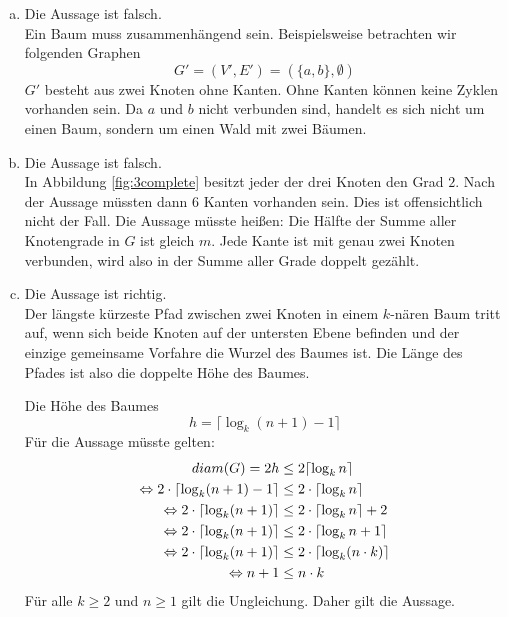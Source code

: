 \documentclass[a4paper]{scrartcl}
\begin{document}
\begin{enumerate}[(a)]
    \item
        Die Aussage ist falsch. \\
        Ein Baum muss zusammenhängend sein.
        Beispielsweise betrachten wir folgenden Graphen
        \begin{equation}
            G' = (V', E') = (\{a, b\}, \emptyset)
        \end{equation}
        $G'$ besteht aus zwei Knoten ohne Kanten.
        Ohne Kanten können keine Zyklen vorhanden sein.
        Da $a$ und $b$ nicht verbunden sind, handelt es sich nicht um einen
        Baum, sondern um einen Wald mit zwei Bäumen.

    \item
        Die Aussage ist falsch. \\
        In Abbildung \ref{fig:3complete} besitzt jeder der drei Knoten den Grad
        $2$.
        Nach der Aussage müssten dann $6$ Kanten vorhanden sein.
        Dies ist offensichtlich nicht der Fall.
        Die Aussage müsste heißen: Die Hälfte der Summe aller Knotengrade in $G$
        ist gleich $m$.
        Jede Kante ist mit genau zwei Knoten verbunden, wird also in der Summe
        aller Grade doppelt gezählt.

    \item
        Die Aussage ist richtig. \\
        Der längste kürzeste Pfad zwischen zwei Knoten in einem $k$-nären Baum
        tritt auf, wenn sich beide Knoten auf der untersten Ebene befinden und
        der einzige gemeinsame Vorfahre die Wurzel des Baumes ist.
        Die Länge des Pfades ist also die doppelte Höhe des Baumes.

        Die Höhe des Baumes
        \begin{equation}
            h = \lceil \log_k (n+1) - 1 \rceil
        \end{equation}
        Für die Aussage müsste gelten:
        \begin{equation}
            \begin{split}
                diam(G) = 2h &\leq 2 \lceil \log_k n \rceil \\
                \Leftrightarrow 2 \cdot \lceil \log_k (n+1) - 1 \rceil &\leq 2 \cdot \lceil \log_k n \rceil \\
                \Leftrightarrow 2 \cdot \lceil \log_k (n+1) \rceil &\leq 2 \cdot \lceil \log_k n \rceil + 2 \\
                \Leftrightarrow 2 \cdot \lceil \log_k (n+1) \rceil &\leq 2 \cdot \lceil \log_k n + 1 \rceil \\
                \Leftrightarrow 2 \cdot \lceil \log_k (n+1) \rceil &\leq 2 \cdot \lceil \log_k (n \cdot k) \rceil \\
                \Leftrightarrow n+1 &\leq n \cdot k
            \end{split}
        \end{equation}
        Für alle $k \geq 2$ und $n \geq 1$ gilt die Ungleichung.
        Daher gilt die Aussage.
        


\end{enumerate}
\end{document}

